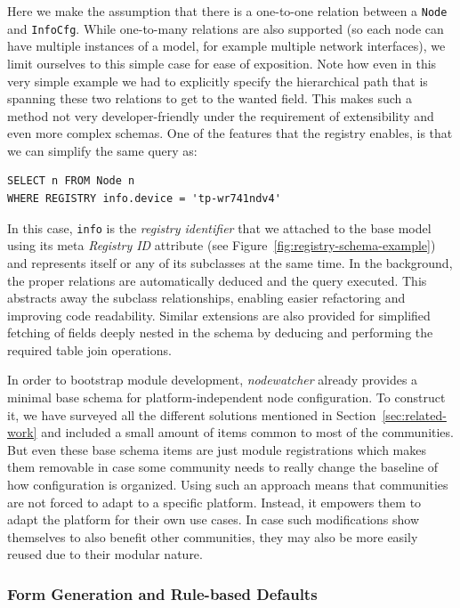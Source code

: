 \documentclass[5p,sort&compress]{elsarticle}
\newcommand{\nodewatcher}{\textit{nodewatcher}}
\begin{document}
Here we make the assumption that there is a one-to-one relation between a \texttt{Node} and \texttt{InfoCfg}.
While one-to-many relations are also supported (so each node can have multiple instances of a model, for example multiple network interfaces), we limit ourselves to this simple case for ease of exposition.
Note how even in this very simple example we had to explicitly specify the hierarchical path that is spanning these two relations to get to the wanted field.
This makes such a method not very developer-friendly under the requirement of extensibility and even more complex schemas.
One of the features that the registry enables, is that we can simplify the same query as:
\begin{verbatim}
SELECT n FROM Node n
WHERE REGISTRY info.device = 'tp-wr741ndv4'
\end{verbatim}

In this case, \texttt{info} is the \textit{registry identifier} that we attached to the base model using its meta \textit{Registry ID} attribute (see Figure~\ref{fig:registry-schema-example}) and represents itself or any of its subclasses at the same time.
In the background, the proper relations are automatically deduced and the query executed.
This abstracts away the subclass relationships, enabling easier refactoring and improving code readability.
Similar extensions are also provided for simplified fetching of fields deeply nested in the schema by deducing and performing the required table join operations.

In order to bootstrap module development, \nodewatcher{} already provides a minimal base schema for platform-independent node configuration.
To construct it, we have surveyed all the different solutions mentioned in Section~\ref{sec:related-work} and included a small amount of items common to most of the communities.
But even these base schema items are just module registrations which makes them removable in case some community needs to really change the baseline of how configuration is organized.
Using such an approach means that communities are not forced to adapt to a specific platform.
Instead, it empowers them to adapt the platform for their own use cases.
In case such modifications show themselves to also benefit other communities, they may also be more easily reused due to their modular nature.

\subsubsection{Form Generation and Rule-based Defaults}
\label{sec:form-generation}
\end{document}
